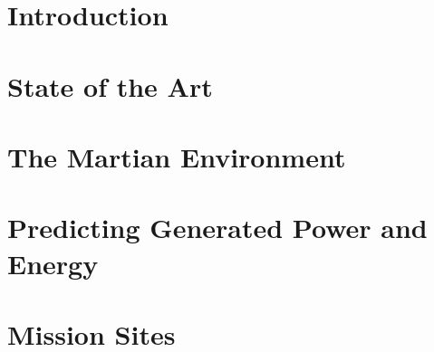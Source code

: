 \documentclass[%
    draft, %
    11pt,
    a4paper
]
{memoir}
\begin{document}

\chapter{Introduction}
\label{sec:Introduction}


\chapter{State of the Art}
\label{sec:StateOfTheArt}



\chapter{The Martian Environment}
\label{sec:MartianEnvironment}


\chapter{Predicting Generated Power and Energy}
\label{sec:PowerAndEnergyPredictions}


\chapter{Mission Sites}
\label{sec:MissionSites}

\end{document}
